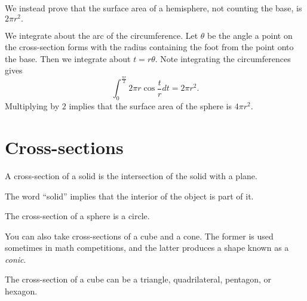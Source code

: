 \begin{pro} %
We instead prove that the surface area of a hemisphere, not counting the base, is $2\pi r^2.$

We integrate about the arc of the circumference. Let $\theta$ be the angle a point on the cross-section forms with the radius containing the foot from the point onto the base. Then we integrate about $t=r\theta.$ Note integrating the circumferences gives
\[\int_0^{\frac{\pi r}{2}}2\pi r\cos\frac{t}{r}dt=2\pi r^2.\]
Multiplying by $2$ implies that the surface area of the sphere is $4\pi r^2.$

\begin{center}
\end{center}
\end{pro}

\section{Cross-sections}

\begin{defi}
A cross-section of a solid is the intersection of the solid with a plane.
\end{defi}

The word “solid” implies that the interior of the object is part of it.

\begin{theo}
The cross-section of a sphere is a circle.
\end{theo}

You can also take cross-sections of a cube and a cone. The former is used sometimes in math competitions, and the latter produces a shape known as a \textit{conic}.

\begin{theo}
The cross-section of a cube can be a triangle, quadrilateral, pentagon, or hexagon.
\end{theo}

